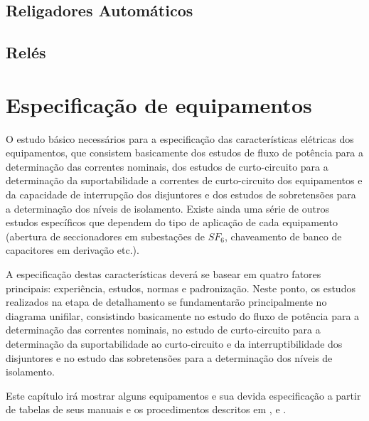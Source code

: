 	\section{Religadores Automáticos}

	\section{Relés}


\chapter{Especificação de equipamentos}
	\label{chap:espEqui}
	O estudo básico necessários para a especificação das características elétricas dos equipamentos, que consistem basicamente dos estudos de fluxo de potência para a determinação das correntes nominais, dos estudos de curto-circuito para a determinação da suportabilidade a correntes de curto-circuito dos equipamentos e da capacidade de interrupção dos disjuntores e dos estudos de sobretensões para a determinação dos níveis de isolamento. Existe ainda uma série de outros estudos específicos que dependem do tipo de aplicação de cada equipamento (abertura de seccionadores em subestações de $SF_6$, chaveamento de banco de capacitores em derivação etc.).\par
	A especificação destas características deverá se basear em quatro fatores principais: experiência, estudos, normas e padronização. Neste ponto, os estudos realizados na etapa de detalhamento se fundamentarão principalmente no diagrama unifilar, consistindo basicamente no estudo do fluxo de potência para a determinação das correntes nominais, no estudo de curto-circuito para a determinação da suportabilidade ao curto-circuito e da interruptibilidade dos disjuntores e no estudo das sobretensões para a determinação dos níveis de isolamento.\par
	Este capítulo irá mostrar alguns equipamentos e sua devida especificação a partir de tabelas de seus manuais e os procedimentos descritos em ,  e .\par

